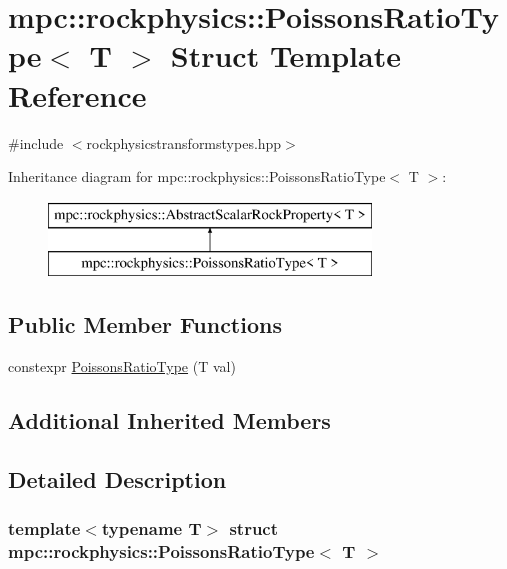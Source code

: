 \hypertarget{structmpc_1_1rockphysics_1_1_poissons_ratio_type}{}\section{mpc\+:\+:rockphysics\+:\+:Poissons\+Ratio\+Type$<$ T $>$ Struct Template Reference}
\label{structmpc_1_1rockphysics_1_1_poissons_ratio_type}


{\ttfamily \#include $<$rockphysicstransformstypes.\+hpp$>$}

Inheritance diagram for mpc\+:\+:rockphysics\+:\+:Poissons\+Ratio\+Type$<$ T $>$\+:\begin{figure}[H]
\begin{center}
\leavevmode
\includegraphics[height=2.000000cm]{structmpc_1_1rockphysics_1_1_poissons_ratio_type}
\end{center}
\end{figure}
\subsection*{Public Member Functions}
\begin{DoxyCompactItemize}
\item 
constexpr \mbox{\hyperlink{structmpc_1_1rockphysics_1_1_poissons_ratio_type_adfd93825fc8410288ea9078dfce8bb47}{Poissons\+Ratio\+Type}} (T val)
\end{DoxyCompactItemize}
\subsection*{Additional Inherited Members}


\subsection{Detailed Description}
\subsubsection*{template$<$typename T$>$\newline
struct mpc\+::rockphysics\+::\+Poissons\+Ratio\+Type$<$ T $>$}



